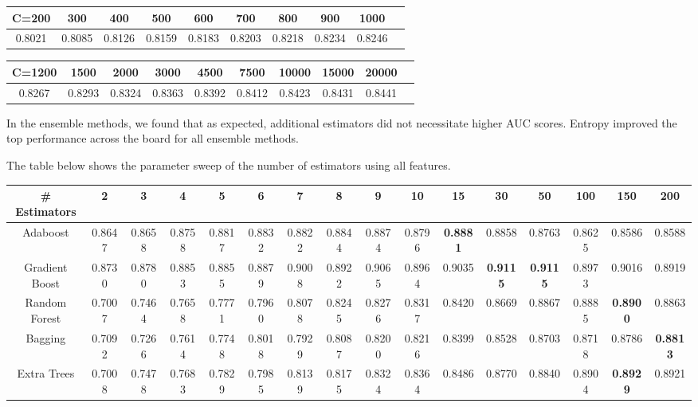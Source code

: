\documentclass{article} %
\begin{document}
\begin{adjustbox}{width=\textwidth,totalheight=\textheight,keepaspectratio}
\begin{tabular}{cccccccccc}
C=200 & 300 & 400 & 500 & 600 & 700 & 800 & 900 & 1000 \\
\hline
0.8021 & 0.8085 & 0.8126 & 0.8159 & 0.8183 & 0.8203 & 0.8218 & 0.8234 & 0.8246
\end{tabular}
\end{adjustbox}

\begin{adjustbox}{width=\textwidth,totalheight=\textheight,keepaspectratio}
\begin{tabular}{cccccccccc}
C=1200 & 1500 & 2000 & 3000 & 4500 & 7500 & 10000 & 15000 & 20000\\
\hline
 0.8267 & 0.8293 & 0.8324 & 0.8363 & 0.8392 & 0.8412 & 0.8423 & 0.8431 & 0.8441
\end{tabular}
\end{adjustbox}

In the ensemble methods, we found that as expected, additional estimators did not necessitate higher AUC scores.
Entropy improved the top performance across the board for all ensemble methods.

The table below shows the parameter sweep of the number of estimators using all features.

\begin{adjustbox}{width=\textwidth,totalheight=\textheight,keepaspectratio}
\begin{tabular}{c | c c c c c c c c c c c c c c c}
\# Estimators & 2 & 3 & 4 & 5 & 6 & 7 & 8 & 9 & 10 & 15 & 30 & 50 & 100 & 150 & 200\\
\hline
Adaboost & 0.8647 & 0.8658 & 0.8758 & 0.8817 & 0.8832 & 0.8822 & 0.8844 & 0.8874 & 0.8796 & \textbf{0.8881} & 0.8858 & 0.8763 & 0.8625 & 0.8586 & 0.8588\\
Gradient Boost & 0.8730 & 0.8780 & 0.8853 & 0.8855 & 0.8879 & 0.9008 & 0.8922 & 0.9065 & 0.8964 & 0.9035 & \textbf{0.9115} & \textbf{0.9115} & 0.8973 & 0.9016 & 0.8919\\
Random Forest & 0.7007 & 0.7464 & 0.7658 & 0.7771 & 0.7960 & 0.8078 & 0.8245 & 0.8276 & 0.8317 & 0.8420 & 0.8669 & 0.8867 & 0.8885 & \textbf{0.8900} & 0.8863\\
Bagging & 0.7092 & 0.7266 & 0.7614 & 0.7748 & 0.8018 & 0.7929 & 0.8087 & 0.8200 & 0.8216 & 0.8399 & 0.8528 & 0.8703 & 0.8718 & 0.8786 & \textbf{0.8813}\\
Extra Trees & 0.7008 & 0.7478 & 0.7683 & 0.7829 & 0.7985 & 0.8139 & 0.8175 & 0.8324 & 0.8364 & 0.8486 & 0.8770 & 0.8840 & 0.8904 & \textbf{0.8929} & 0.8921
\end{tabular}
\end{adjustbox}
\end{document}

